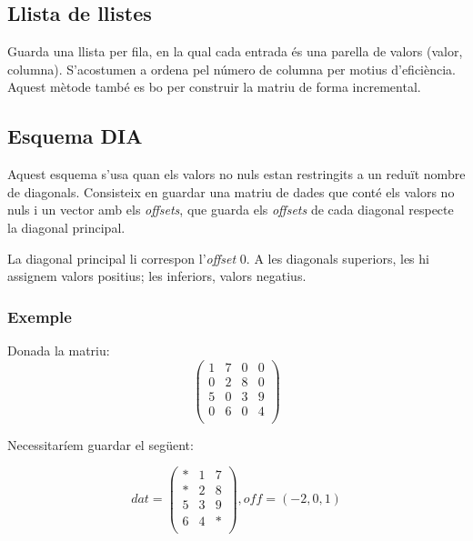 \documentclass[11pt,a4paper,twoside]{report}
\begin{document}
	 \subsection{Llista de llistes}
  
  Guarda una llista per fila, en la qual cada entrada és una parella de valors (valor, columna). S'acostumen a ordena pel número de columna per motius d'eficiència. Aquest mètode també es bo per construir la matriu de forma incremental.
  
  \subsection{Esquema DIA}
  
  Aquest esquema s'usa quan els valors no nuls estan restringits a un reduït nombre de diagonals. Consisteix en guardar una matriu de dades que conté els valors no nuls i un vector amb els \textit{offsets}, que guarda els \textit{offsets} de cada diagonal respecte la diagonal principal.
  
  La diagonal principal li correspon l'\textit{offset} 0. A les diagonals superiors, les hi assignem valors positius; les inferiors, valors negatius.
  
  \subsubsection*{Exemple}
	
	Donada la matriu:
	 \[
	 	\begin{pmatrix}
  		  	1	&	7	& 0	&	0	\\
  		  	0	&	2	&	8	&	0	\\
   		 	5	&	0	&	3	&	9	\\
    		0	&	6	&	0	&	4	\\
    \end{pmatrix} \]
    
    Necessitaríem guardar el següent:
     
      \[ dat = 
	 	\begin{pmatrix}
  		  	*	&	1	& 7	\\
  		  	*	&	2	&	8	\\
   		 	5	&	3	&	9	\\
    		6	&	4	&	*	\\
    \end{pmatrix} , off = (-2, 0, 1)    
     \] 
  
  
  
  



  
\end{document}
